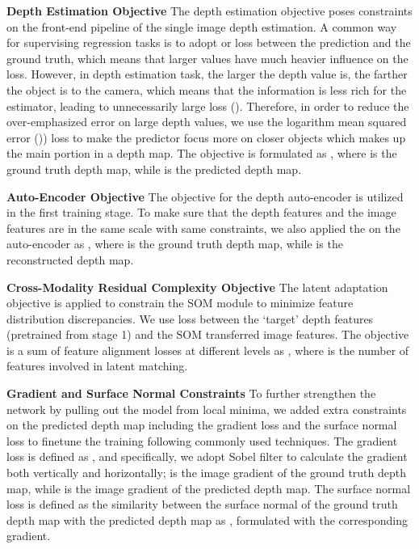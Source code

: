 \documentclass[letterpaper]{article} \usepackage{aaai20}  \usepackage{times}  \usepackage{helvet} \usepackage{courier}  \usepackage{graphicx} \frenchspacing  \setlength{\pdfpagewidth}{8.5in}  \setlength{\pdfpageheight}{11in}  \usepackage{epsfig}
\begin{document}
    \textbf{Depth Estimation Objective} \hspace{0.3cm} The depth estimation objective poses constraints on the front-end pipeline of the single image depth estimation. A common way for supervising regression tasks is to adopt  or  loss between the prediction and the ground truth, which means that larger values have much heavier influence on the loss. However, in depth estimation task, the larger the depth value is, the farther the object is to the camera, which means that the information is less rich for the estimator, leading to unnecessarily large loss (\cite{Fu2018Deep}). Therefore, in order to reduce the over-emphasized error on large depth values, we use the logarithm mean squared error ()) loss to make the predictor focus more on closer objects which makes up the main portion in a depth map. The objective is formulated as , where  is the ground truth depth map, while  is the predicted depth map.
    
    \textbf{Auto-Encoder Objective} \hspace{0.3cm} The objective for the depth auto-encoder is utilized in the first training stage. To make sure that the depth features and the image features are in the same scale with same constraints, we also applied the  on the auto-encoder as , where  is the ground truth depth map, while  is the reconstructed depth map. 
    
    \textbf{Cross-Modality Residual Complexity Objective} \hspace{0.3cm} The latent adaptation objective is applied to constrain the SOM module to minimize feature distribution discrepancies. We use  loss between the `target' depth features (pretrained from stage 1) and the SOM transferred image features. The objective is a sum of feature alignment losses at different levels as , where  is the number of features involved in latent matching. 
    
    \textbf{Gradient and Surface Normal Constraints} \hspace{0.3cm} To further strengthen the network by pulling out the model from local minima, we added extra constraints on the predicted depth map including the gradient loss and the surface normal loss to finetune the training following commonly used techniques. The gradient loss is defined as , and specifically, we adopt Sobel filter to calculate the gradient both vertically and horizontally;  is the image gradient of the ground truth depth map, while  is the image gradient of the predicted depth map. 
    The surface normal loss is defined as the similarity between the surface normal of the ground truth depth map with the predicted depth map as , formulated with the corresponding gradient. 
    
\end{document}
